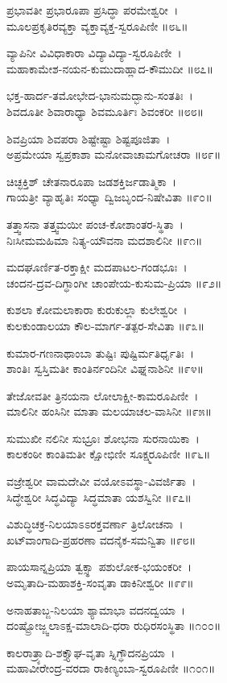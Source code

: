 ಪ್ರಭಾವತೀ ಪ್ರಭಾರೂಪಾ ಪ್ರಸಿದ್ಧಾ ಪರಮೇಶ್ವರೀ~।\\
ಮೂಲಪ್ರಕೃತಿರವ್ಯಕ್ತಾ ವ್ಯಕ್ತಾವ್ಯಕ್ತ-ಸ್ವರೂಪಿಣೀ ॥೮೬॥

ವ್ಯಾಪಿನೀ  ವಿವಿಧಾಕಾರಾ ವಿದ್ಯಾವಿದ್ಯಾ-ಸ್ವರೂಪಿಣೀ~।\\
ಮಹಾಕಾಮೇಶ-ನಯನ-ಕುಮುದಾಹ್ಲಾದ-ಕೌಮುದೀ ॥೮೭॥

ಭಕ್ತ-ಹಾರ್ದ-ತಮೋಭೇದ-ಭಾನುಮದ್ಭಾನು-ಸಂತತಿಃ~।\\
ಶಿವದೂತೀ ಶಿವಾರಾಧ್ಯಾ ಶಿವಮೂರ್ತಿಃ ಶಿವಂಕರೀ ॥೮೮॥

ಶಿವಪ್ರಿಯಾ ಶಿವಪರಾ ಶಿಷ್ಟೇಷ್ಟಾ ಶಿಷ್ಟಪೂಜಿತಾ~।\\
ಅಪ್ರಮೇಯಾ ಸ್ವಪ್ರಕಾಶಾ ಮನೋವಾಚಾಮಗೋಚರಾ ॥೮೯॥

ಚಿಚ್ಛಕ್ತಿಶ್ ಚೇತನಾರೂಪಾ ಜಡಶಕ್ತಿರ್ಜಡಾತ್ಮಿಕಾ~।\\
ಗಾಯತ್ರೀ ವ್ಯಾಹೃತಿಃ ಸಂಧ್ಯಾ ದ್ವಿಜಬೃಂದ-ನಿಷೇವಿತಾ ॥೯೦॥

ತತ್ತ್ವಾಸನಾ ತತ್ತ್ವಮಯೀ ಪಂಚ-ಕೋಶಾಂತರ-ಸ್ಥಿತಾ~।\\
ನಿಃಸೀಮಮಹಿಮಾ ನಿತ್ಯ-ಯೌವನಾ ಮದಶಾಲಿನೀ ॥೯೧॥

ಮದಘೂರ್ಣಿತ-ರಕ್ತಾಕ್ಷೀ ಮದಪಾಟಲ-ಗಂಡಭೂಃ~।\\
ಚಂದನ-ದ್ರವ-ದಿಗ್ಧಾಂಗೀ ಚಾಂಪೇಯ-ಕುಸುಮ-ಪ್ರಿಯಾ ॥೯೨॥

ಕುಶಲಾ ಕೋಮಲಾಕಾರಾ ಕುರುಕುಲ್ಲಾ ಕುಲೇಶ್ವರೀ~।\\
ಕುಲಕುಂಡಾಲಯಾ ಕೌಲ-ಮಾರ್ಗ-ತತ್ಪರ-ಸೇವಿತಾ ॥೯೩॥

ಕುಮಾರ-ಗಣನಾಥಾಂಬಾ ತುಷ್ಟಿಃ ಪುಷ್ಟಿರ್ಮತಿರ್ಧೃತಿಃ~।\\
ಶಾಂತಿಃ ಸ್ವಸ್ತಿಮತೀ ಕಾಂತಿರ್ನಂದಿನೀ ವಿಘ್ನನಾಶಿನೀ ॥೯೪॥

ತೇಜೋವತೀ ತ್ರಿನಯನಾ ಲೋಲಾಕ್ಷೀ-ಕಾಮರೂಪಿಣೀ~।\\
ಮಾಲಿನೀ ಹಂಸಿನೀ ಮಾತಾ ಮಲಯಾಚಲ-ವಾಸಿನೀ ॥೯೫॥

ಸುಮುಖೀ ನಲಿನೀ ಸುಭ್ರೂಃ ಶೋಭನಾ ಸುರನಾಯಿಕಾ~।\\
ಕಾಲಕಂಠೀ ಕಾಂತಿಮತೀ ಕ್ಷೋಭಿಣೀ ಸೂಕ್ಷ್ಮರೂಪಿಣೀ ॥೯೬॥

ವಜ್ರೇಶ್ವರೀ ವಾಮದೇವೀ ವಯೋಽವಸ್ಥಾ-ವಿವರ್ಜಿತಾ~।\\
ಸಿದ್ಧೇಶ್ವರೀ ಸಿದ್ಧವಿದ್ಯಾ ಸಿದ್ಧಮಾತಾ ಯಶಸ್ವಿನೀ ॥೯೭॥

ವಿಶುದ್ಧಿಚಕ್ರ-ನಿಲಯಾಽಽರಕ್ತವರ್ಣಾ ತ್ರಿಲೋಚನಾ~।\\
ಖಟ್‍ವಾಂಗಾದಿ-ಪ್ರಹರಣಾ ವದನೈಕ-ಸಮನ್ವಿತಾ ॥೯೮॥

ಪಾಯಸಾನ್ನಪ್ರಿಯಾ ತ್ವಕ್ಸ್ಥಾ ಪಶುಲೋಕ-ಭಯಂಕರೀ~।\\
ಅಮೃತಾದಿ-ಮಹಾಶಕ್ತಿ-ಸಂವೃತಾ ಡಾಕಿನೀಶ್ವರೀ ॥೯೯॥

ಅನಾಹತಾಬ್ಜ-ನಿಲಯಾ ಶ್ಯಾಮಾಭಾ ವದನದ್ವಯಾ~।\\
ದಂಷ್ಟ್ರೋಜ್ಜ್ವಲಾಽಕ್ಷ-ಮಾಲಾದಿ-ಧರಾ ರುಧಿರಸಂಸ್ಥಿತಾ ॥೧೦೦॥

ಕಾಲರಾತ್ರ್ಯಾದಿ-ಶಕ್ತ್ಯೌಘ-ವೃತಾ ಸ್ನಿಗ್ಧೌದನಪ್ರಿಯಾ~।\\
ಮಹಾವೀರೇಂದ್ರ-ವರದಾ ರಾಕಿಣ್ಯಂಬಾ-ಸ್ವರೂಪಿಣೀ ॥೧೦೧॥


